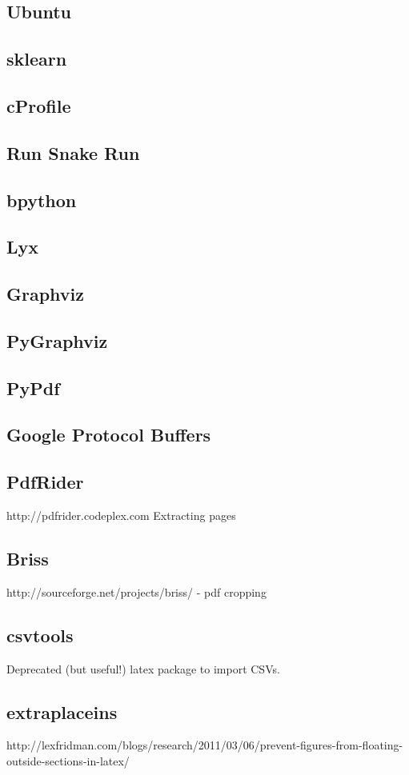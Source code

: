 \documentclass[a4paper,11pt]{report}
\begin{document}
\subsection*{Ubuntu}
\subsection*{sklearn}
\subsection*{cProfile}
\subsection*{Run Snake Run}
\subsection*{bpython}
\subsection*{Lyx}
\subsection*{Graphviz}
\subsection*{PyGraphviz}
\subsection*{PyPdf}
\subsection*{Google Protocol Buffers}
\subsection*{PdfRider}
http://pdfrider.codeplex.com
Extracting pages
\subsection*{Briss}
http://sourceforge.net/projects/briss/ - pdf cropping
\subsection*{csvtools}
Deprecated (but useful!) latex package to import CSVs.

\subsection*{extraplaceins}
http://lexfridman.com/blogs/research/2011/03/06/prevent-figures-from-floating-outside-sections-in-latex/




\end{document}
